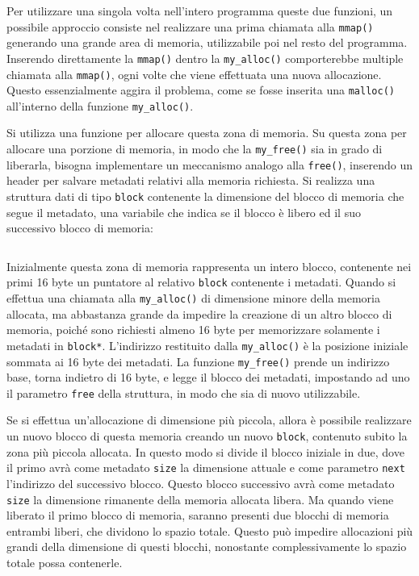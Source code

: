 \documentclass{article}
\numberwithin{equation}{subsection}
\begin{document}
Per utilizzare una singola volta nell'intero programma queste due funzioni, un possibile approccio consiste nel realizzare una prima chiamata alla \verb|mmap()| generando una grande 
area di memoria, utilizzabile poi nel resto del programma. Inserendo direttamente la \verb|mmap()| dentro la \verb|my_alloc()| comporterebbe multiple chiamata alla \verb|mmap()|, ogni volte 
che viene effettuata una nuova allocazione. Questo essenzialmente aggira il problema, come se 
fosse inserita una \verb|malloc()| all'interno della funzione \verb|my_alloc()|. 


Si utilizza una funzione per allocare questa zona di memoria. Su questa zona per allocare 
una porzione di memoria, in modo che la \verb|my_free()| sia in grado di liberarla, bisogna 
implementare un meccanismo analogo alla \verb|free()|, inserendo un header per salvare metadati 
relativi alla memoria richiesta. Si realizza una struttura dati di tipo \verb|block| contenente la dimensione del blocco di memoria che segue il metadato, una variabile che 
indica se il blocco è libero ed il suo successivo blocco di memoria:
\inputminted[firstline=21,lastline=26]{c}{./"Esercitazione del 19-11-24"/domanda4.c}
Inizialmente questa zona di memoria rappresenta un intero blocco, contenente nei primi 16 byte un puntatore al relativo \verb|block| contenente i metadati. 
Quando si effettua una chiamata alla \verb|my_alloc()| di dimensione minore della memoria 
allocata, ma abbastanza grande da impedire la creazione di un altro blocco di memoria, poiché sono richiesti almeno 16 byte per memorizzare solamente i metadati in \verb|block*|. L'indirizzo restituito dalla \verb|my_alloc()| è la posizione iniziale sommata ai 16 byte dei metadati. 
La funzione \verb|my_free()| prende un indirizzo base, torna indietro di 16 byte, e legge il 
blocco dei metadati, impostando ad uno il parametro \verb|free| della struttura, in modo che sia 
di nuovo utilizzabile. 

Se si effettua un'allocazione di dimensione più piccola, allora è possibile realizzare un nuovo 
blocco di questa memoria creando un nuovo \verb|block|, contenuto subito la zona più piccola 
allocata. In questo modo si divide il blocco iniziale in due, dove il primo avrà come metadato \verb|size| la dimensione attuale e come parametro \verb|next| l'indirizzo del successivo blocco. Questo blocco successivo avrà come metadato \verb|size| la dimensione rimanente della 
memoria allocata libera. 
Ma quando viene liberato il primo blocco di memoria, saranno presenti due blocchi di memoria 
entrambi liberi, che dividono lo spazio totale. Questo può impedire allocazioni più grandi della 
dimensione di questi blocchi, nonostante complessivamente lo spazio totale possa contenerle. 
\end{document}

